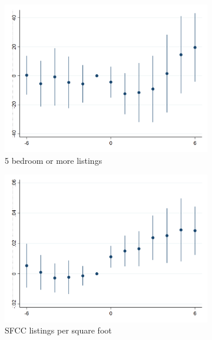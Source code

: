 \begin{figure}[h!]
\begin{subfigure}{0.5\textwidth}
        \includegraphics[width=0.95\linewidth]{analysis/event_study/output/last_rent_mfr5plus_w6.png}
        \caption{5 bedroom or more listings} \label{appfig:event_study_5BR}
    \end{subfigure}%
    \begin{subfigure}{0.5\textwidth} \centering
        \includegraphics[width=0.95\linewidth]{analysis/event_study/output/last_rentpsqft_sfcc_w6.png}
        \caption{SFCC listings per square foot} \label{appfig:event_study_SFCCpsqft}
    \end{subfigure}\\
    \begin{subfigure}{0.5\textwidth} \centering

\end{subfigure}
\end{figure}
